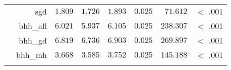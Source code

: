 \begin{table}[H]
{\begin{tabular}{lrrrrrrr}
			                     & sgd                  & $1.809$              & $1.726$                                         & $1.893$              & $0.025$              & $71.612$             & $<$ .001    \\
			                     & bhh\_all             & $6.021$              & $5.937$                                         & $6.105$              & $0.025$              & $238.307$            & $<$ .001    \\
			                     & bhh\_gd              & $6.819$              & $6.736$                                         & $6.903$              & $0.025$              & $269.897$            & $<$ .001    \\
			                     & bhh\_mh              & $3.668$              & $3.585$                                         & $3.752$              & $0.025$              & $145.188$            & $<$ .001    \\
			\bottomrule
			\addlinespace[1ex]
		\end{tabular}
	}
\end{table}

